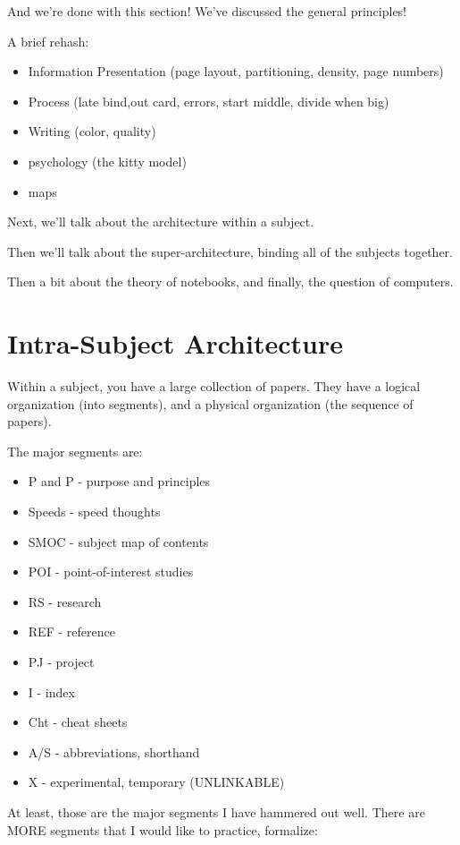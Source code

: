 \documentclass[oneside]{book}
\begin{document}
And we're done with this section! We've discussed the general
principles!

A brief rehash:

\begin{itemize}
\item Information Presentation (page layout, partitioning, density,
  page numbers)
\item Process (late bind,out card, errors, start middle, divide when big)
\item Writing (color, quality)
\item psychology (the kitty model)
\item maps
\end{itemize}

Next, we'll talk about the architecture within a subject.

Then we'll talk about the super-architecture, binding all of the
subjects together.

Then a bit about the theory of notebooks, and finally, the question of
computers.


\chapter{Intra-Subject Architecture}
Within a subject, you have a large collection of papers. They have a
logical organization (into segments), and a physical organization (the
sequence of papers).

The major segments are:

\begin{itemize}
\item P and P     - purpose and principles
\item Speeds  - speed thoughts
\item SMOC    - subject map of contents
\item POI     - point-of-interest studies
\item RS      - research
\item REF     - reference
\item PJ      - project
\item I       - index
\item Cht     - cheat sheets
\item A/S     - abbreviations, shorthand
\item X       - experimental, temporary (UNLINKABLE)
\end{itemize}

At least, those are the major segments I have hammered out well. There
are MORE segments that I would like to practice, formalize:
\end{document}
